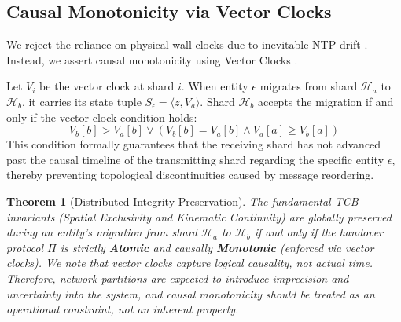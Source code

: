 \documentclass[conference]{IEEEtran}
\newtheorem{theorem}{Theorem}
\begin{document}
\subsection{Causal Monotonicity via Vector Clocks}
We reject the reliance on physical wall-clocks due to inevitable NTP drift \cite{b8}. Instead, we assert causal monotonicity using Vector Clocks \cite{b13}. 

Let $V_i$ be the vector clock at shard $i$. When entity $\epsilon$ migrates from shard $\mathcal{H}_a$ to $\mathcal{H}_b$, it carries its state tuple $S_\epsilon = \langle z, V_a \rangle$.
Shard $\mathcal{H}_b$ accepts the migration if and only if the vector clock condition holds:
\begin{equation}
V_b[b] > V_a[b] \lor (V_b[b] = V_a[b] \land V_a[a] \ge V_b[a])
\end{equation}
This condition formally guarantees that the receiving shard has not advanced past the causal timeline of the transmitting shard regarding the specific entity $\epsilon$, thereby preventing topological discontinuities caused by message reordering.

\begin{theorem}[Distributed Integrity Preservation]
The fundamental TCB invariants (Spatial Exclusivity and Kinematic Continuity) are globally preserved during an entity's migration from shard $\mathcal{H}_a$ to $\mathcal{H}_b$ if and only if the handover protocol $\Pi$ is strictly \textbf{Atomic} and causally \textbf{Monotonic} (enforced via vector clocks). We note that vector clocks capture logical causality, not actual time. Therefore, network partitions are expected to introduce imprecision and uncertainty into the system, and causal monotonicity should be treated as an operational constraint, not an inherent property.
\end{theorem}
\end{document}
